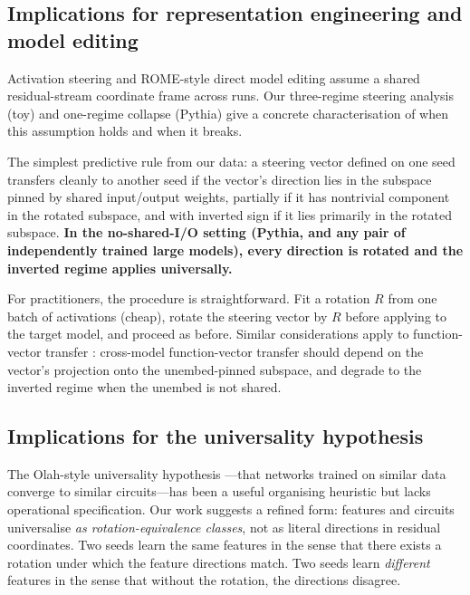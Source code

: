 \documentclass[11pt,letterpaper]{article}
\newcommand{\R}{R}
\begin{document}
\subsection{Implications for representation engineering and model editing}

Activation steering \citep{turner2023activation,zou2023representation} and ROME-style direct model editing \citep{meng2022rome,meng2023memit} assume a shared residual-stream coordinate frame across runs. Our three-regime steering analysis (toy) and one-regime collapse (Pythia) give a concrete characterisation of when this assumption holds and when it breaks.

The simplest predictive rule from our data: a steering vector defined on one seed transfers cleanly to another seed if the vector's direction lies in the subspace pinned by shared input/output weights, partially if it has nontrivial component in the rotated subspace, and with inverted sign if it lies primarily in the rotated subspace. \textbf{In the no-shared-I/O setting (Pythia, and any pair of independently trained large models), every direction is rotated and the inverted regime applies universally.}

For practitioners, the procedure is straightforward. Fit a rotation $\R$ from one batch of activations (cheap), rotate the steering vector by $\R$ before applying to the target model, and proceed as before. Similar considerations apply to function-vector transfer \citep{todd2024function}: cross-model function-vector transfer should depend on the vector's projection onto the unembed-pinned subspace, and degrade to the inverted regime when the unembed is not shared.

\subsection{Implications for the universality hypothesis}

The Olah-style universality hypothesis \citep{olah2020zoom}---that networks trained on similar data converge to similar circuits---has been a useful organising heuristic but lacks operational specification. Our work suggests a refined form: features and circuits universalise \emph{as rotation-equivalence classes}, not as literal directions in residual coordinates. Two seeds learn the same features in the sense that there exists a rotation under which the feature directions match. Two seeds learn \emph{different} features in the sense that without the rotation, the directions disagree.
\end{document}
